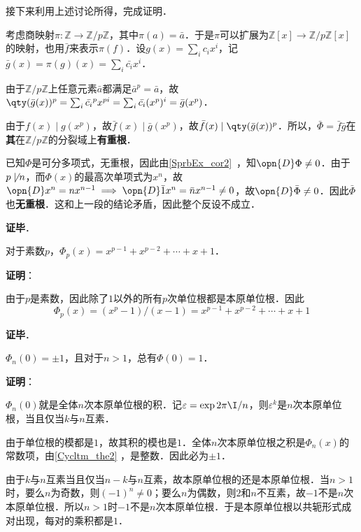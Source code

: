 接下来利用上述讨论所得，完成证明．

考虑商映射$\pi:\mathbb{Z}\to\mathbb{Z}/p\mathbb{Z}$，其中$\pi(a)=\bar{a}$．于是$\pi$可以扩展为$\mathbb{Z}[x]\to\mathbb{Z}/p\mathbb{Z}[x]$的映射，也用$\bar{f}$来表示$\pi(f)$．设$g(x)=\sum_i c_ix^i$，记$\bar{g}(x)=\pi(g)(x)=\sum_i \bar{c_i}x^i$．

由于$\mathbb{Z}/p\mathbb{Z}$上任意元素$\bar{a}$都满足$\bar{a}^p=\bar{a}$，故$\qty(\bar{g}(x))^p=\sum_i\bar{c_i}^px^{pi}=\sum_i \bar{c_i}(x^p)^i=\bar{g}(x^p)$．

由于$f(x)\mid g(x^p)$，故$\bar{f}(x)\mid \bar{g}(x^p)$，故$\bar{f}(x)\mid \qty(\bar{g}(x))^p$．所以，$\bar{\Phi}=\bar{f}\bar{g}$在\textbf{其}在$\mathbb{Z}/p\mathbb{Z}$的分裂域上\textbf{有重根}．

已知$\Phi$是可分多项式，无重根，因此由\autoref{SprbEx_cor2}~，知$\opn{D}\Phi\neq 0$．由于$p\not\mid n$，而$\Phi(x)$的最高次单项式为$x^n$，故$\opn{D}x^n=nx^{n-1}\implies \opn{D} \bar{1}x^n=\bar{n}x^{n-1}\neq 0$，故$\opn{D}\bar{\Phi}\neq 0$．因此$\bar{\Phi}$也\textbf{无重根}．这和上一段的结论矛盾，因此整个反设不成立．

\textbf{证毕}．



\begin{theorem}{}
对于素数$p$，$\Phi_p(x)=x^{p-1}+x^{p-2}+\cdots+x+1$．
\end{theorem}

\textbf{证明}：

由于$p$是素数，因此除了$1$以外的所有$p$次单位根都是本原单位根．因此
\begin{equation}
\Phi_p(x) = (x^p-1)/(x-1) = x^{p-1}+x^{p-2}+\cdots+x+1
\end{equation}

\textbf{证毕}．






\begin{theorem}{}
$\Phi_n(0)=\pm 1$，且对于$n>1$，总有$\Phi(0)=1$．
\end{theorem}

\textbf{证明}：

$\Phi_n(0)$就是全体$n$次本原单位根的积．记$\varepsilon=\exp{2\pi\I/n}$，则$\varepsilon^k$是$n$次本原单位根，当且仅当$k$与$n$互素．

由于单位根的模都是$1$，故其积的模也是$1$．全体$n$次本原单位根之积是$\Phi_n(x)$的常数项，由\autoref{Cycltm_the2} ，是整数．因此必为$\pm 1$．

由于$k$与$n$互素当且仅当$n-k$与$n$互素，故本原单位根的还是本原单位根．当$n>1$时，要么$n$为奇数，则$(-1)^n\neq 0$；要么$n$为偶数，则$2$和$n$不互素，故$-1$不是$n$次本原单位根．所以$n>1$时$-1$不是$n$次本原单位根．于是本原单位根以共轭形式成对出现，每对的乘积都是$1$．

